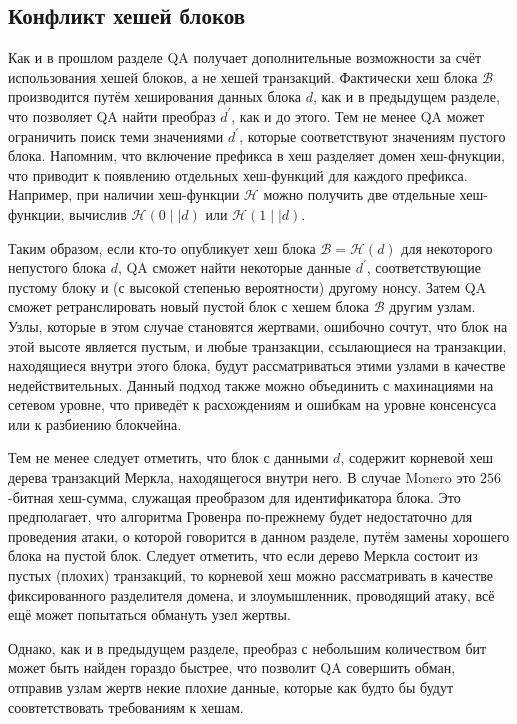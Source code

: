 \documentclass{mrl}
\begin{document}
\subsection{Конфликт хешей блоков}

Как и в прошлом разделе QA получает дополнительные возможности за счёт использования хешей блоков, а не хешей транзакций. Фактически хеш блока $\mathcal{B}$ производится путём хеширования данных блока $d$, как и в предыдущем разделе, что позволяет QA найти преобраз $d^\prime$, как и до этого. Тем не менее QA может ограничить поиск теми значениями $d^\prime$, которые соответствуют значениям пустого блока. Напомним, что включение префикса в хеш разделяет домен хеш-фнукции, что приводит к появлению отдельных хеш-функций для каждого префикса. Например, при наличии хеш-функции $\mathcal{H}$ можно получить две отдельные хеш-функции, вычислив $\mathcal{H}(0 \mid \mid d)$ или $\mathcal{H}(1 \mid \mid d)$. 

Таким образом, если кто-то опубликует хеш блока $\mathcal{B} = \mathcal{H}(d)$ для некоторого непустого блока $d$, QA сможет найти некоторые данные $d^\prime$, соответствующие пустому блоку и (с высокой степенью вероятности) другому нонсу. Затем QA сможет ретранслировать новый пустой блок с хешем блока $\mathcal{B}$ другим узлам. Узлы, которые в этом случае становятся жертвами, ошибочно сочтут, что блок на этой высоте является пустым, и любые транзакции, ссылающиеся на транзакции, находящиеся внутри этого блока, будут рассматриваться этими узлами в качестве недействительных. Данный подход также можно объединить с махинациями на сетевом уровне, что приведёт к расхождениям и ошибкам на уровне консенсуса или к разбиению блокчейна.

Тем не менее следует отметить, что блок с данными $d$, содержит корневой хеш дерева транзакций Меркла, находящегося внутри него. В случае Monero это $256$-битная хеш-сумма, служащая преобразом для идентификатора блока. Это предполагает, что алгоритма Гровенра по-прежнему будет недостаточно для проведения атаки, о которой говорится в данном разделе, путём замены хорошего блока на пустой блок. Следует отметить, что если дерево Меркла состоит из пустых (плохих) транзакций, то корневой хеш можно рассматривать в качестве фиксированного разделителя домена, и злоумышленник, проводящий атаку, всё ещё может попытаться обмануть узел жертвы.

Однако, как и в предыдущем разделе, преобраз с небольшим количеством бит может быть найден гораздо быстрее, что позволит QA совершить обман, отправив узлам жертв некие плохие данные, которые как будто бы будут соовтетствовать требованиям к хешам.
\end{document}
